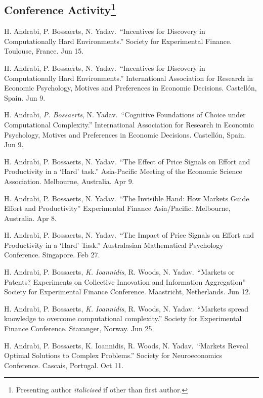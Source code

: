 \documentclass[11pt,letterpaper]{report}
\begin{document}
    \subsection*{Conference Activity\footnote{Presenting author \textit{italicised} if other than first author.}}
    \begin{tablist}
        \item[2026] \tab{}H. Andrabi, P. Bossaerts, N. Yadav.\ \enquote{Incentives for Discovery in Computationally Hard Environments.} Society for Experimental Finance. Toulouse, France. Jun 15.
        \item[2026] \tab{}H. Andrabi, P. Bossaerts, N. Yadav.\ \enquote{Incentives for Discovery in Computationally Hard Environments.} International Association for Research in Economic Psychology, Motives and Preferences in Economic Decisions. Castellón, Spain. Jun 9.
        \item[2026] \tab{}H. Andrabi, \textit{P. Bossaerts}, N. Yadav.\ \enquote{Cognitive Foundations of Choice under Computational Complexity.} International Association for Research in Economic Psychology, Motives and Preferences in Economic Decisions. Castellón, Spain. Jun 9.
        \item[2026] \tab{}H. Andrabi, P. Bossaerts, N. Yadav.\ \enquote{The Effect of Price Signals on Effort and Productivity in a `Hard' task.} Asia-Pacific Meeting of the Economic Science Association. Melbourne, Australia. Apr 9.
        \item[2026] \tab{}H. Andrabi, P. Bossaerts, N. Yadav.\ \enquote{The Invisible Hand: How Markets Guide Effort and Productivity} Experimental Finance Asia/Pacific. Melbourne, Australia. Apr 8.
        \item[2026] \tab{}H. Andrabi, P. Bossaerts, N. Yadav.\ \enquote{The Impact of Price Signals on Effort and Productivity in a `Hard' Task.} Australasian Mathematical Psychology Conference. Singapore. Feb 27.
        \item[2025] \tab{}H. Andrabi, P. Bossaerts, \textit{K. Ioannidis}, R. Woods, N. Yadav.\ \enquote{Markets or Patents? Experiments on Collective Innovation and Information Aggregation} Society for Experimental Finance Conference. Maastricht, Netherlands. Jun 12.
        \item[2024] \tab{}H. Andrabi, P. Bossaerts, \textit{K. Ioannidis}, R. Woods, N. Yadav.\ \enquote{Markets spread knowledge to overcome computational complexity.} Society for Experimental Finance Conference. Stavanger, Norway. Jun 25.
        \item[2024] \tab{}H. Andrabi, P. Bossaerts, K. Ioannidis, R. Woods, N. Yadav.\ \enquote{Markets Reveal Optimal Solutions to Complex Problems.} Society for Neuroeconomics Conference. Cascais, Portugal. Oct 11.
    \end{tablist}
\end{document}
